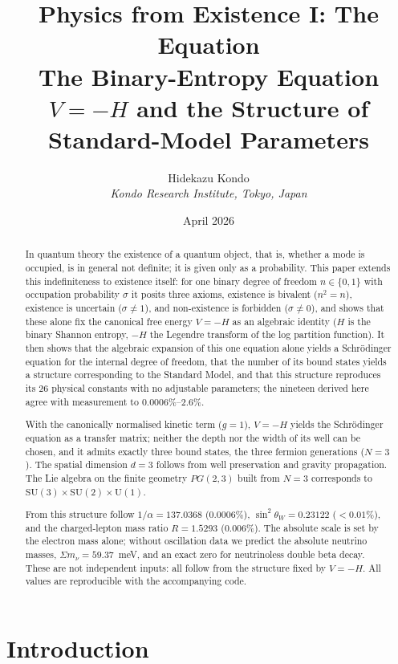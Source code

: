 \documentclass[12pt,a4paper]{article}
\title{\textbf{Physics from Existence I: The Equation}\\[0.45em]{\large The Binary-Entropy Equation $V = -H$ and the Structure of Standard-Model Parameters}}
\author{Hidekazu Kondo\\ \textit{Kondo Research Institute, Tokyo, Japan}}
\date{April 2026}
\begin{document}
\maketitle

\begin{abstract}\sloppy
In quantum theory the existence of a quantum object, that is, whether a mode is occupied, is in general not definite; it is given only as a probability. This paper extends this indefiniteness to existence itself: for one binary degree of freedom $n \in \{0,1\}$ with occupation probability $\sigma$ it posits three axioms, existence is bivalent ($n^2{=}n$), existence is uncertain ($\sigma{\neq}1$), and non-existence is forbidden ($\sigma{\neq}0$), and shows that these alone fix the canonical free energy $V = -H$ as an algebraic identity ($H$ is the binary Shannon entropy, $-H$ the Legendre transform of the log partition function). It then shows that the algebraic expansion of this one equation alone yields a Schr\"odinger equation for the internal degree of freedom, that the number of its bound states yields a structure corresponding to the Standard Model, and that this structure reproduces its 26 physical constants with no adjustable parameters; the nineteen derived here agree with measurement to $0.0006\%$--$2.6\%$.

With the canonically normalised kinetic term ($g = 1$), $V = -H$ yields the Schr\"odinger equation as a transfer matrix; neither the depth nor the width of its well can be chosen, and it admits exactly three bound states, the three fermion generations ($N = 3$). The spatial dimension $d = 3$ follows from well preservation and gravity propagation. The Lie algebra on the finite geometry $PG(2,3)$ built from $N = 3$ corresponds to $\mathrm{SU}(3){\times}\mathrm{SU}(2){\times}\mathrm{U}(1)$.

From this structure follow $1/\alpha = 137.0368$ ($0.0006\%$), $\sin^2\!\theta_W = 0.23122$ ($<0.01\%$), and the charged-lepton mass ratio $R = 1.5293$ ($0.006\%$). The absolute scale is set by the electron mass alone; without oscillation data we predict the absolute neutrino masses, $\Sigma m_\nu = 59.37$~meV, and an exact zero for neutrinoless double beta decay. These are not independent inputs: all follow from the structure fixed by $V = -H$. All values are reproducible with the accompanying code.
\end{abstract}


\section{Introduction}
\end{document}
